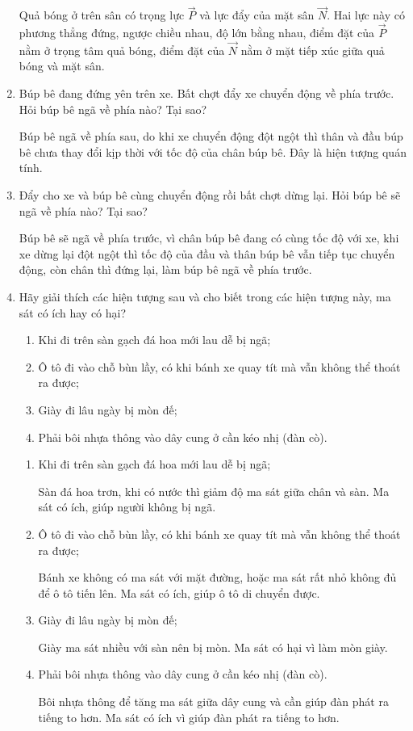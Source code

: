 \begin{enumerate}[label=\bfseries Câu \arabic*:]
{	Quả bóng ở trên sân có trọng lực $\vec P$ và lực đẩy của mặt sân $\vec N$. Hai lực này có phương thẳng đứng, ngược chiều nhau, độ lớn bằng nhau, điểm đặt của $\vec P$ nằm ở trọng tâm quả bóng, điểm đặt của $\vec N$ nằm ở mặt tiếp xúc giữa quả bóng và mặt sân.
	}
	\item {}
	
	\cauhoi
	{Búp bê đang đứng yên trên xe. Bất chợt đẩy xe chuyển động về phía trước. Hỏi búp bê ngã về phía nào? Tại sao?
	}
	
	\loigiai
	{Búp bê ngã về phía sau, do khi xe chuyển động đột ngột thì thân và đầu búp bê chưa thay đổi kịp thời với tốc độ của chân búp bê. Đây là hiện tượng quán tính.
	}
	\item {}
	
	\cauhoi
	{Đẩy cho xe và búp bê cùng chuyển động rồi bất chợt dừng lại. Hỏi búp bê sẽ ngã về phía nào? Tại sao?
	}
	
	\loigiai
	{Búp bê sẽ ngã về phía trước, vì chân búp bê đang có cùng tốc độ với xe, khi xe dừng lại đột ngột thì tốc độ của đầu và thân búp bê vẫn tiếp tục chuyển động, còn chân thì đứng lại, làm búp bê ngã về phía trước.
	}
	\item {}
	
	\cauhoi
	{Hãy giải thích các hiện tượng sau và cho biết trong các hiện tượng này, ma sát có ích hay có hại?
		\begin{enumerate}
			\item Khi đi trên sàn gạch đá hoa mới lau dễ bị ngã;
			\item Ô tô đi vào chỗ bùn lầy, có khi bánh xe quay tít mà vẫn không thể thoát ra được;
			\item Giày đi lâu ngày bị mòn đế;
			\item Phải bôi nhựa thông vào dây cung ở cần kéo nhị (đàn cò).
		\end{enumerate}
	}
	
	\loigiai
	{
		\begin{enumerate}
			\item Khi đi trên sàn gạch đá hoa mới lau dễ bị ngã;
			
			Sàn đá hoa trơn, khi có nước thì giảm độ ma sát giữa chân và sàn. Ma sát có ích, giúp người không bị ngã.
			
			\item Ô tô đi vào chỗ bùn lầy, có khi bánh xe quay tít mà vẫn không thể thoát ra được;
			
			Bánh xe không có ma sát với mặt đường, hoặc ma sát rất nhỏ không đủ để ô tô tiến lên. Ma sát có ích, giúp ô tô di chuyển được.
			
			\item Giày đi lâu ngày bị mòn đế;
			
			Giày ma sát nhiều với sàn nên bị mòn. Ma sát có hại vì làm mòn giày.
			
			\item Phải bôi nhựa thông vào dây cung ở cần kéo nhị (đàn cò).
			
			Bôi nhựa thông để tăng ma sát giữa dây cung và cần giúp đàn phát ra tiếng to hơn. Ma sát có ích vì giúp đàn phát ra tiếng to hơn.
		\end{enumerate}
	}
\end{enumerate}